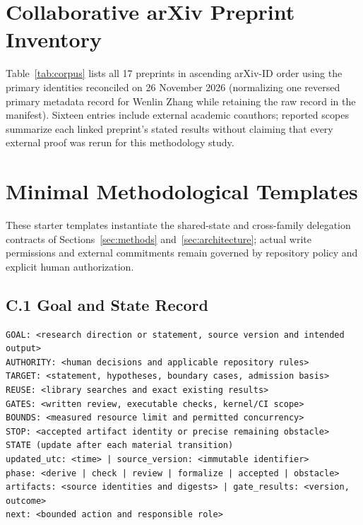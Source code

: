 \documentclass[11pt,a4paper]{article}
\begin{document}
\clearpage
\section{Collaborative arXiv Preprint Inventory}
\label{app:corpus}
Table~\ref{tab:corpus} lists all 17 preprints in ascending arXiv-ID order using
the primary identities reconciled on 26 November 2026 (normalizing one reversed
primary metadata record for Wenlin Zhang while retaining the raw record in the
manifest). Sixteen entries include external academic coauthors; reported scopes
summarize each linked preprint's stated results without claiming that every
external proof was rerun for this methodology study.


\clearpage
\section{Minimal Methodological Templates}
\label{app:templates}
These starter templates instantiate the shared-state and cross-family
delegation contracts of Sections~\ref{sec:methods} and~\ref{sec:architecture};
actual write permissions and external commitments remain governed by repository
policy and explicit human authorization.

\subsection*{C.1 Goal and State Record}
\begingroup\fontsize{8.5}{10}\selectfont
\begin{verbatim}
GOAL: <research direction or statement, source version and intended output>
AUTHORITY: <human decisions and applicable repository rules>
TARGET: <statement, hypotheses, boundary cases, admission basis>
REUSE: <library searches and exact existing results>
GATES: <written review, executable checks, kernel/CI scope>
BOUNDS: <measured resource limit and permitted concurrency>
STOP: <accepted artifact identity or precise remaining obstacle>
STATE (update after each material transition)
updated_utc: <time> | source_version: <immutable identifier>
phase: <derive | check | review | formalize | accepted | obstacle>
artifacts: <source identities and digests> | gate_results: <version, outcome>
next: <bounded action and responsible role>
\end{verbatim}
\endgroup
\end{document}

